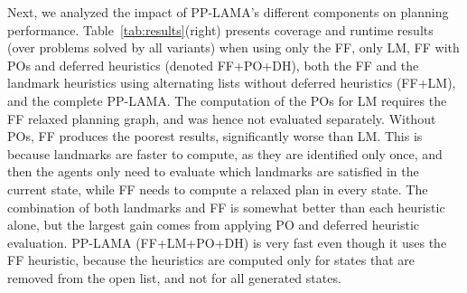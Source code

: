 \documentclass[letterpaper]{article}
\theoremstyle{definition}
\begin{document}
Next, we analyzed the impact of PP-LAMA's different components on planning performance. Table~\ref{tab:results}(right) presents coverage and runtime results (over problems solved by all variants) when using only the FF, only LM, FF with POs and deferred heuristics (denoted FF+PO+DH), both the FF and the landmark heuristics using alternating lists without deferred heuristics (FF+LM), and the complete PP-LAMA. 
The computation of the POs for LM requires the FF relaxed planning graph, and was hence not evaluated separately. 
Without POs, FF produces the poorest results, significantly worse than LM. This is because landmarks are faster to compute, as they are identified only once, and then the agents only need to evaluate which landmarks are satisfied in the current state, while FF needs to compute a relaxed plan in every state. The combination of both landmarks and FF is somewhat better than each heuristic alone, but the largest gain comes from applying PO and deferred heuristic evaluation. PP-LAMA (FF+LM+PO+DH) is very fast even though it uses the FF heuristic, because the heuristics are computed only for states that are removed from the open list, and not for all generated states.


\end{document}

